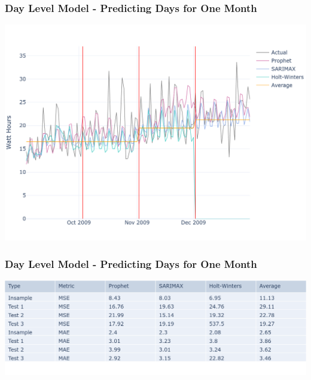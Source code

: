 \documentclass[10pt]{beamer}
\begin{document}
\begin{frame}
\frametitle{Day Level Model - Predicting Days for One Month}

\bigskip
{
    \centering
    \includegraphics[width=\textwidth,height=\textheight,keepaspectratio]{model_comparison_timeseries_daymodel_days.png}
    \par
}
\bigskip

\end{frame}

\begin{frame}
\frametitle{Day Level Model - Predicting Days for One Month}

\bigskip
{
    \centering
    \includegraphics[width=\textwidth,height=\textheight,keepaspectratio]{model_comparison_table_daymodel_days.png}
    \par
}
\bigskip

\end{frame}
\end{document}
